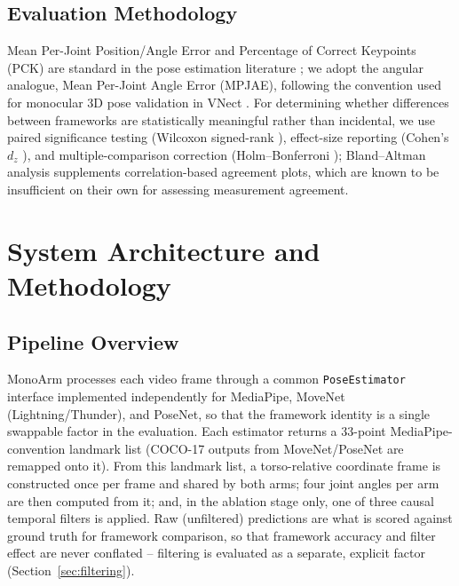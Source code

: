 \documentclass[conference]{IEEEtran}
\begin{document}
\subsection{Evaluation Methodology}
Mean Per-Joint Position/Angle Error and Percentage of Correct Keypoints
(PCK) are standard in the pose estimation literature
\cite{yang2011articulated,mehta2017vnect}; we adopt the angular analogue,
Mean Per-Joint Angle Error (MPJAE), following the convention used for
monocular 3D pose validation in VNect \cite{mehta2017vnect}. For
determining whether differences between frameworks are statistically
meaningful rather than incidental, we use paired significance testing
(Wilcoxon signed-rank \cite{wilcoxon1945individual}), effect-size
reporting (Cohen's $d_z$ \cite{cohen1988statistical}), and
multiple-comparison correction (Holm--Bonferroni
\cite{holm1979simple}); Bland--Altman analysis \cite{bland1986statistical}
supplements correlation-based agreement plots, which are known to be
insufficient on their own for assessing measurement agreement.

\section{System Architecture and Methodology}

\subsection{Pipeline Overview}
MonoArm processes each video frame through a common
\texttt{PoseEstimator} interface implemented independently for
MediaPipe, MoveNet (Lightning/Thunder), and PoseNet, so that the
framework identity is a single swappable factor in the evaluation. Each
estimator returns a 33-point MediaPipe-convention landmark list (COCO-17
outputs from MoveNet/PoseNet are remapped onto it). From this landmark
list, a torso-relative coordinate frame is constructed once per frame and
shared by both arms; four joint angles per arm are then computed from it;
and, in the ablation stage only, one of three causal temporal filters is
applied. Raw (unfiltered) predictions are what is scored against ground
truth for framework comparison, so that framework accuracy and filter
effect are never conflated -- filtering is evaluated as a separate,
explicit factor (Section~\ref{sec:filtering}).
\end{document}
